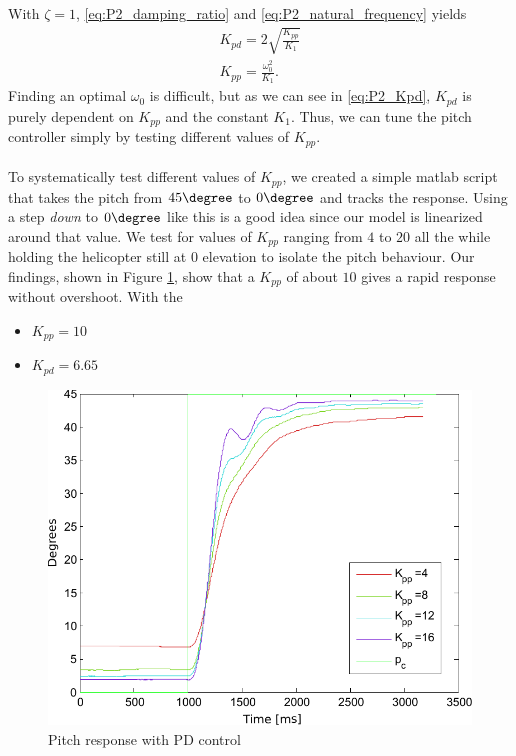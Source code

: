 With $\zeta = 1$, \cref{eq:P2_damping_ratio} and \cref{eq:P2_natural_frequency} yields 
\begin{align}
    K_{pd} = 2\sqrt{\frac{K_{pp}}{K_1}} \label{eq:P2_Kpd} \\
    K_{pp} = \frac{\omega_0^2}{K_1}. \label{eq:P2_Kpp} 
\end{align}
Finding an optimal $\omega_0$ is difficult, but as we can see in \cref{eq:P2_Kpd}, $K_{pd}$ is purely dependent on $K_{pp}$ and the constant $K_1$. Thus, we can tune the pitch controller simply by testing different values of $K_{pp}$.\\
\\
To systematically test different values of $K_{pp}$, we created a simple matlab script that takes the pitch from $45\degree$ to $0\degree$ and tracks the response. Using a step \textit{down} to $0\degree$ like this is a good idea since our model is linearized around that value. We test for values of $K_{pp}$ ranging from $4$ to $20$ all the while holding the helicopter still at 0 elevation to isolate the pitch behaviour. Our findings, shown in Figure \cref{fig:P2p1_K_pp}, show that a $K_{pp}$ of about $10$ gives a rapid response without overshoot. With the 
\begin{itemize}
    \item $K_{pp} = 10$
    \item $K_{pd} = 6.65$
\end{itemize}
\begin{figure}[!!ht!!!!!!!!tb!!]
	\centering
		\includegraphics[width=1\textwidth,trim={0cm 0cm 0cm 0cm},clip]{figures/P2p1_K_pp_label.pdf}
	\caption{Pitch response with PD control}
\label{fig:P2p1_K_pp}
\end{figure}
